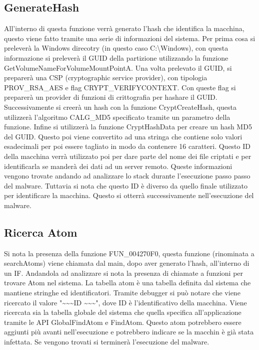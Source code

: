 \documentclass[]{article}
\begin{document}
\subsection{GenerateHash}
All'interno di questa funzione verrà generato l'hash che identifica la macchina, questo viene fatto tramite una serie di informazioni del sistema. Per prima cosa si preleverà la Windows direcotry (in questo caso C:\textbackslash Windows), con questa informazione si preleverà il GUID della partizione utilizzando la funzione GetVolumeNameForVolumeMountPointA. Una volta prelevato il GUID, si preparerà una CSP (cryptographic service provider), con tipologia PROV\_RSA\_AES e flag CRYPT\_VERIFYCONTEXT. Con queste flag si preparerà un provider di funzioni di crittografia per hashare il GUID. Successivamente si creerà un hash con la funzione CryptCreateHash, questa utilizzerà l'algoritmo CALG\_MD5 specificato tramite un parametro della funzione. Infine si utilizzerà la funzione CryptHashData per creare un hash MD5 del GUID. Questo poi viene convertito ad una stringa che contiene solo valori esadecimali per poi essere tagliato in modo da contenere 16 caratteri. Questo ID della macchina verrà utilizzato poi per dare parte del nome dei file criptati e per identificarla se manderà dei dati ad un server remoto. Queste informazioni vengono trovate andando ad analizzare lo stack durante l'esecuzione passo passo del malware. Tuttavia si nota che questo ID è diverso da quello finale utilizzato per identificare la macchina. Questo si otterrà successivamente nell'esecuzione del malware.

\subsection{Ricerca Atom}
Si nota la presenza della funzione FUN\_004270F0, questa funzione (rinominata a searchAtoms) viene chiamata dal main, dopo aver generato l'hash, all'interno di un IF. Andandola ad analizzare si nota la presenza di chiamate a funzioni per trovare Atom nel sistema. La tabella atom è una tabella definita dal sistema che mantiene stringhe ed identificatori. Tramite debugger si può notare che viene ricercato il valore "\textasciitilde\textasciitilde\textasciitilde ID \textasciitilde\textasciitilde\textasciitilde", dove ID è l'identificativo della macchina. Viene ricercata sia la tabella globale del sistema che quella specifica all'applicazione tramite le API GlobalFindAtom e FindAtom. 
Questo atom potrebbero essere aggiunti più avanti nell'esecuzione e potrebbero indicare se la macchin è già stata infettata. Se vengono trovati si terminerà l'esecuzione del malware. 
\end{document}
